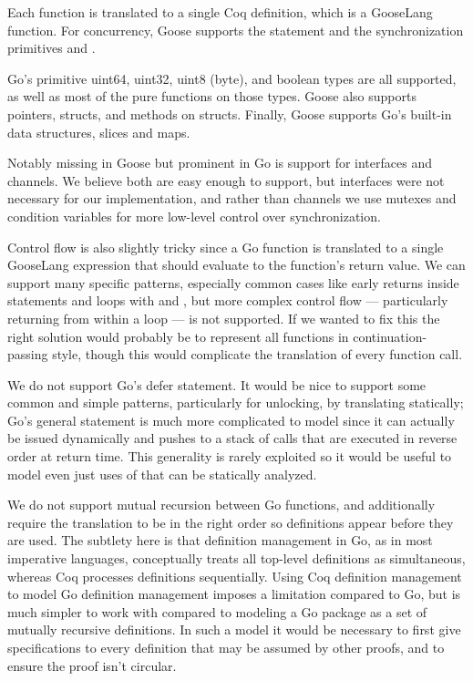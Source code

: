 Each function is translated to a single Coq definition, which is a
GooseLang function. For concurrency, Goose supports the 
statement and the synchronization primitives  and
.

Go's primitive uint64, uint32, uint8 (byte), and boolean types are all
supported, as well as most of the pure functions on those types. Goose
also supports pointers, structs, and methods on structs. Finally, Goose
supports Go's built-in data structures, slices and maps.

Notably missing in Goose but prominent in Go is support for interfaces
and channels. We believe both are easy enough to support, but interfaces
were not necessary for our implementation, and rather than channels we
use mutexes and condition variables for more low-level control over
synchronization.

Control flow is also slightly tricky since a Go function is translated
to a single GooseLang expression that should evaluate to the function's
return value. We can support many specific patterns, especially common
cases like early returns inside  statements and loops with
 and , but more complex control flow ---
particularly returning from within a loop --- is not supported. If we
wanted to fix this the right solution would probably be to represent all
functions in continuation-passing style, though this would complicate
the translation of every function call.

We do not support Go's defer statement. It would be nice to support some
common and simple patterns, particularly for unlocking, by translating
 statically; Go's general  statement is much more
complicated to model since it can actually be issued dynamically and
pushes to a stack of calls that are executed in reverse order at return
time. This generality is rarely exploited so it would be useful to model even
just uses of  that can be statically analyzed.

We do not support mutual recursion between Go functions, and
additionally require the translation to be in the right order so
definitions appear before they are used. The subtlety here is that
definition management in Go, as in most imperative languages,
conceptually treats all top-level definitions as simultaneous, whereas
Coq processes definitions sequentially. Using Coq definition management
to model Go definition management imposes a limitation compared to Go,
but is much simpler to work with compared to modeling a Go package as a
set of mutually recursive definitions. In such a model it would be
necessary to first give specifications to every definition that may be
assumed by other proofs, and to ensure the proof isn't circular.

